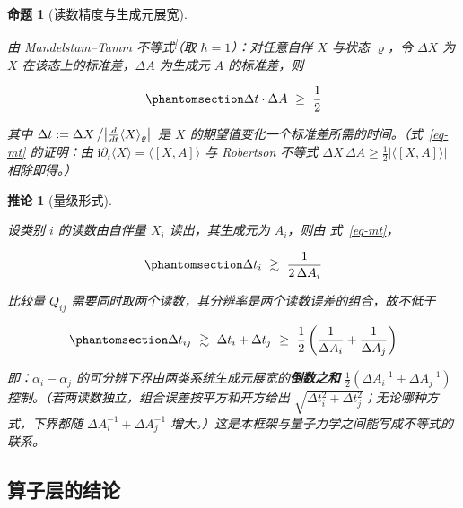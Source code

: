\documentclass[
  chinese,
  a4paper,
  UTF8,
  12pt,
  oneside,
  openany]{ctexbook}
\theoremstyle{plain}
\theoremstyle{plain}
\theoremstyle{plain}
\newtheorem{proposition}{命题}[chapter]
\theoremstyle{definition}
\theoremstyle{plain}
\newtheorem{corollary}{推论}[chapter]
\theoremstyle{plain}
\theoremstyle{remark}
\begin{document}
\begin{proposition}[读数精度与生成元展宽]\protect\hypertarget{prp-mt}{}\label{prp-mt}

由 Mandelstam--Tamm
不等式\textsuperscript{{[}\citeproc{ref-mandelstamtamm1945}{32}{]}}（取
\(\hbar=1\)）：对任意自伴 \(X\) 与状态 \(\varrho\)，令 \(\Delta X\) 为
\(X\) 在该态上的标准差，\(\Delta A\) 为生成元 \(A\) 的标准差，则

\begin{equation}\protect\phantomsection\label{eq-mt}{
\Delta t \cdot \Delta A \ \ge\ \frac{1}{2}
}\end{equation}

其中
\(\Delta t:=\Delta X\left/\left|\frac{d}{dt}\langle X\rangle_{\varrho}\right|\right.\)
是 \(X\) 的期望值变化一个标准差所需的时间。（式~\ref{eq-mt} 的证明：由
\(\mathrm{i}\partial_{t}\langle X\rangle=\langle[X,A]\rangle\) 与
Robertson 不等式
\(\Delta X\,\Delta A\ge\frac{1}{2}\left|\langle[X,A]\rangle\right|\)
相除即得。）

\end{proposition}

\begin{corollary}[量级形式]\protect\hypertarget{cor-mt-relative}{}\label{cor-mt-relative}

设类别 \(i\) 的读数由自伴量 \(X_i\) 读出，其生成元为 \(A_i\)，则由
式~\ref{eq-mt}，

\begin{equation}\protect\phantomsection\label{eq-mt-i}{
\Delta t_i\ \gtrsim\ \frac{1}{2\,\Delta A_i}
}\end{equation}

比较量 \(Q_{ij}\)
需要同时取两个读数，其分辨率是两个读数误差的组合，故不低于

\begin{equation}\protect\phantomsection\label{eq-mt-sum}{
\Delta t_{ij}\ \gtrsim\ \Delta t_i+\Delta t_j\ \ge\ \frac{1}{2}\left(\frac{1}{\Delta A_i}+\frac{1}{\Delta A_j}\right)
}\end{equation}

即：\(\alpha_i-\alpha_j\)
的可分辨下界由两类系统生成元展宽的\textbf{倒数之和}
\(\frac{1}{2}\left(\Delta A_i^{-1}+\Delta A_j^{-1}\right)\)
控制。（若两读数独立，组合误差按平方和开方给出
\(\sqrt{\Delta t_i^{2}+\Delta t_j^{2}}\)；无论哪种方式，下界都随
\(\Delta A_i^{-1}+\Delta A_j^{-1}\)
增大。）这是本框架与量子力学之间能写成不等式的联系。

\end{corollary}

\subsection{算子层的结论}\label{ux7b97ux5b50ux5c42ux7684ux7ed3ux8bba}
\end{document}
